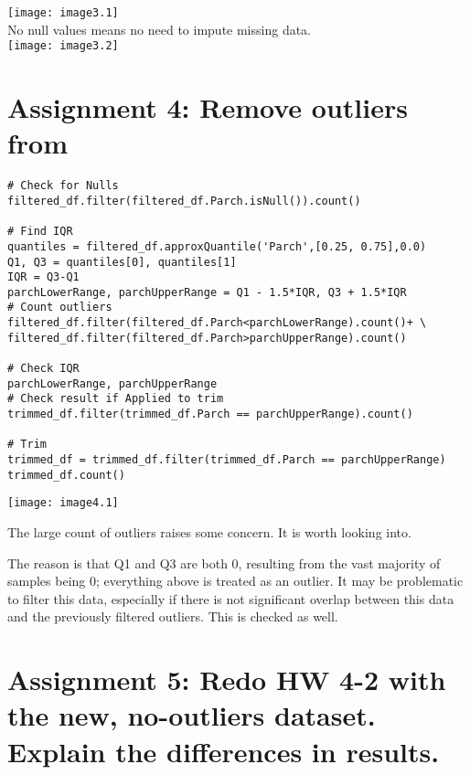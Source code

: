 \documentclass[]{article}
\begin{document}
\texttt{[image: image3.1]} \\

No null values means no need to impute missing data. \\

\texttt{[image: image3.2]} \\

\clearpage

\section*{Assignment 4: Remove outliers from }

\begin{verbatim}
# Check for Nulls
filtered_df.filter(filtered_df.Parch.isNull()).count()

# Find IQR 
quantiles = filtered_df.approxQuantile('Parch',[0.25, 0.75],0.0)
Q1, Q3 = quantiles[0], quantiles[1]
IQR = Q3-Q1
parchLowerRange, parchUpperRange = Q1 - 1.5*IQR, Q3 + 1.5*IQR
# Count outliers
filtered_df.filter(filtered_df.Parch<parchLowerRange).count()+ \
filtered_df.filter(filtered_df.Parch>parchUpperRange).count()

# Check IQR
parchLowerRange, parchUpperRange
# Check result if Applied to trim
trimmed_df.filter(trimmed_df.Parch == parchUpperRange).count()

# Trim
trimmed_df = trimmed_df.filter(trimmed_df.Parch == parchUpperRange)
trimmed_df.count()
\end{verbatim}
\texttt{[image: image4.1]}

The large count of outliers raises some concern.
It is worth looking into. \vspace{1em}

The reason is that Q1 and Q3 are both 0, resulting from the vast majority of samples being 0; everything above is treated as an outlier.
It may be problematic to filter this data, especially if there is not significant overlap between this data and the previously filtered outliers. 
This is checked as well.

\clearpage

\section*{Assignment 5: Redo HW 4-2 with the new, no-outliers dataset. Explain the differences in results.}
\end{document}
